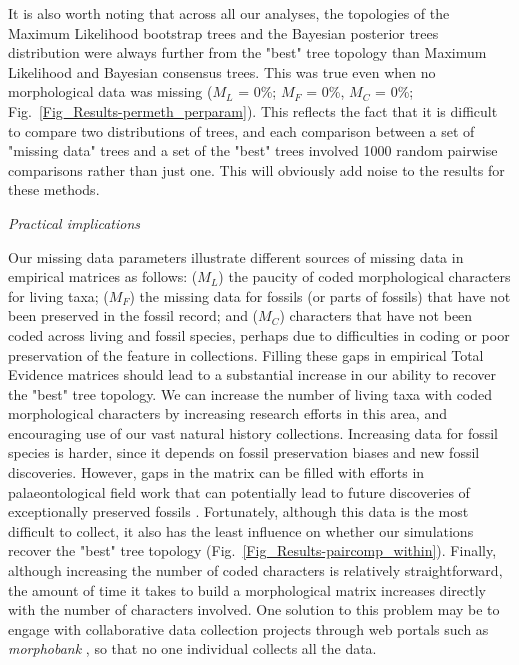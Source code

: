 \documentclass[12pt,letterpaper]{article}
\renewcommand{\subsection}[1]{%
\bigskip
\begin{center}
\begin{large}
\normalfont\itshape #1
\end{large}
\end{center}}
\begin{document}
It is also worth noting that across all our analyses, the topologies of the Maximum Likelihood bootstrap trees and the Bayesian posterior trees distribution were always further from the "best" tree topology than Maximum Likelihood and Bayesian consensus trees. This was true even when no morphological data was missing ($M_{L}$ = 0\%; $M_{F}$ = 0\%, $M_{C}$ = 0\%; Fig.~\ref{Fig_Results-permeth_perparam}). This reflects the fact that it is difficult to compare two distributions of trees, and each comparison between a set of "missing data" trees and a set of the "best" trees involved 1000 random pairwise comparisons rather than just one. This will obviously add noise to the results for these methods.

\subsection{Practical implications}
Our missing data parameters illustrate different sources of missing data in empirical matrices as follows: ($M_{L}$) the paucity of coded morphological characters for living taxa; ($M_{F}$) the missing data for fossils (or parts of fossils) that have not been preserved in the fossil record; and ($M_{C}$) characters that have not been coded across living and fossil species, perhaps due to difficulties in coding or poor preservation of the feature in collections. Filling these gaps in empirical Total Evidence matrices should lead to a substantial increase in our ability to recover the "best" tree topology. We can increase the number of living taxa with coded morphological characters by increasing research efforts in this area, and encouraging use of our vast natural history collections. Increasing data for fossil species is harder, since it depends on fossil preservation biases and new fossil discoveries. However, gaps in the matrix can be filled with efforts in palaeontological field work that can potentially lead to future discoveries of exceptionally preserved fossils \citep[e.g.][]{nithe2013}. Fortunately, although this data is the most difficult to collect, it also has the least influence on whether our simulations recover the "best" tree topology (Fig.~\ref{Fig_Results-paircomp_within}). Finally, although increasing the number of coded characters is relatively straightforward, the amount of time it takes to build a morphological matrix increases directly with the number of characters involved. One solution to this problem may be to engage with collaborative data collection projects through web portals such as \textit{morphobank} \citep{morphobank}, so that no one individual collects all the data.
\end{document}
